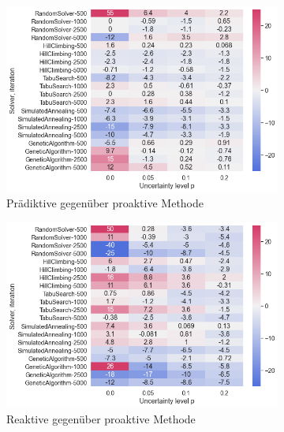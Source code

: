 \begin{figure}[H]

    \begin{subfigure}{0.497\linewidth}
        \centering
        \includegraphics[width=\linewidth]{assets/img/05_Evaluation/heatmap_m1_1.png}
        \caption{Prädiktive gegenüber proaktive Methode}
        \label{fig:evaluation_solver_m1_heatmap_1}
    \end{subfigure}
    \hfill
    \begin{subfigure}{0.497\linewidth}
        \centering
        \includegraphics[width=\linewidth]{assets/img/05_Evaluation/heatmap_m1_2.png}
        \caption{Reaktive gegenüber proaktive Methode}
        \label{fig:evaluation_solver_m1_heatmap_2}
    \end{subfigure}
    \par\bigskip 
    \begin{subfigure}{1\linewidth}

\end{subfigure}
\end{figure}
